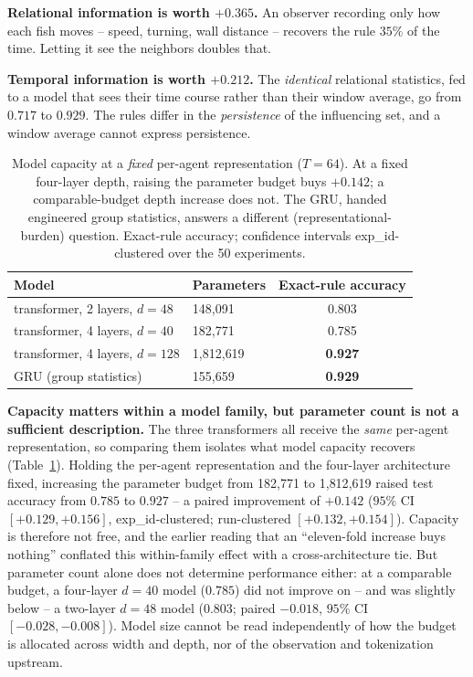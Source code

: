\documentclass[11pt]{article}
\begin{document}
\textbf{Relational information is worth $+0.365$.} An observer recording only how
each fish moves -- speed, turning, wall distance -- recovers the rule $35\%$ of the
time. Letting it see the neighbors doubles that.

\textbf{Temporal information is worth $+0.212$.} The \emph{identical} relational
statistics, fed to a model that sees their time course rather than their window
average, go from $0.717$ to $0.929$. The rules differ in the \emph{persistence} of the
influencing set, and a window average cannot express persistence.

\begin{table}[t]
\centering
\small
\caption{Model capacity at a \emph{fixed} per-agent representation ($T=64$). At a fixed
four-layer depth, raising the parameter budget buys $+0.142$; a comparable-budget depth
increase does not. The GRU, handed engineered group statistics, answers a different
(representational-burden) question. Exact-rule accuracy; confidence intervals
exp\_id-clustered over the 50 experiments.}
\label{tab:capacity}
\begin{tabular}{llc}
\toprule
Model & Parameters & Exact-rule accuracy \\
\midrule
transformer, 2 layers, $d{=}48$  & 148{,}091     & 0.803 \\
transformer, 4 layers, $d{=}40$  & 182{,}771     & 0.785 \\
transformer, 4 layers, $d{=}128$ & 1{,}812{,}619 & \textbf{0.927} \\
GRU (group statistics)           & 155{,}659     & \textbf{0.929} \\
\bottomrule
\end{tabular}
\end{table}

\textbf{Capacity matters within a model family, but parameter count is not a
sufficient description.} The three transformers all receive the \emph{same} per-agent
representation, so comparing them isolates what model capacity recovers
(Table~\ref{tab:capacity}). Holding the per-agent representation and the four-layer
architecture fixed, increasing the parameter budget from 182{,}771 to 1{,}812{,}619
raised test accuracy from $0.785$ to $0.927$ -- a paired improvement of $+0.142$
($95\%$ CI $[+0.129,+0.156]$, exp\_id-clustered; run-clustered $[+0.132,+0.154]$).
Capacity is therefore not free, and the earlier reading that an ``eleven-fold increase
buys nothing'' conflated this within-family effect with a cross-architecture tie. But
parameter count alone does not determine performance either: at a comparable budget, a
four-layer $d{=}40$ model ($0.785$) did not improve on -- and was slightly below -- a
two-layer $d{=}48$ model ($0.803$; paired $-0.018$, $95\%$ CI $[-0.028,-0.008]$). Model
size cannot be read independently of how the budget is allocated across width and
depth, nor of the observation and tokenization upstream.
\end{document}
